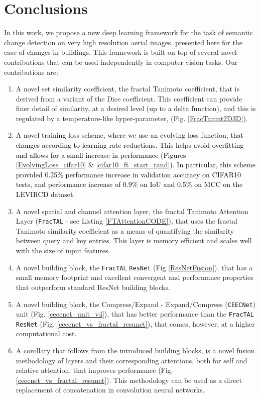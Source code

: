 \documentclass[times, 5p]{elsarticle}
\def \FracTAL {\texttt{FracTAL} }
\newcommand{\ceecnet}{\texttt{CEECNet}}
\begin{document}
\section{Conclusions}


In this work, we propose a new deep learning framework for the task of semantic change detection on very high resolution aerial images, presented here for the case of changes in buildings. This framework is built on top of several novel contributions that can be used independently in computer vision tasks. Our contributions are: 
\begin{enumerate}
\item A novel set similarity coefficient, the fractal Tanimoto coefficient, that is derived from a variant of the Dice coefficient. This coefficient can provide finer detail of similarity, at a desired level (up to a delta function), and this is regulated by a temperature-like hyper-parameter,  (Fig. \ref{FracTanmt2D3D}). 
\item \textcolor{black}{A novel training loss scheme, where we use an evolving loss function, that changes according to learning rate reductions. This helps avoid overfitting and allows for a small increase in performance (Figures \ref{EvolvingLoss_cifar10} \& \ref{cifar10_ft_start_rand}). In particular, this scheme provided 0.25\% performance increase in validation accuracy on CIFAR10 tests, and  performance increase of 0.9\%  on IoU and 0.5\% on MCC on the LEVIRCD dataset.}
\item A novel spatial and channel attention layer, the fractal Tanimoto Attention Layer (\FracTAL - see Listing \ref{FTAttentionCODE}), that uses the fractal Tanimoto similarity coefficient as a means of quantifying the similarity between query and key entries. This layer is memory efficient and scales well with the size of input features. 
\item A novel building block, the \FracTAL \texttt{ResNet} (Fig \ref{ResNetFusion}), that has a small memory footprint and excellent convergent  and performance properties that outperform standard ResNet building blocks. 
\item A novel building block, the Compress/Expand - Expand/Compress (\ceecnet{}) unit (Fig. \ref{ceecnet_unit_v4}), that has better performance than the \FracTAL \texttt{ResNet} (Fig. \ref{ceecnet_vs_fractal_resunet}), that comes, however, at a higher computational cost. 
\item A corollary that follows from the introduced building blocks, is a novel fusion methodology of layers and their corresponding attentions, both for self and relative attention, that improves performance (Fig. \ref{ceecnet_vs_fractal_resunet}). This methodology can be used as a direct replacement of concatenation in convolution neural networks.     

\end{enumerate}
\end{document}
